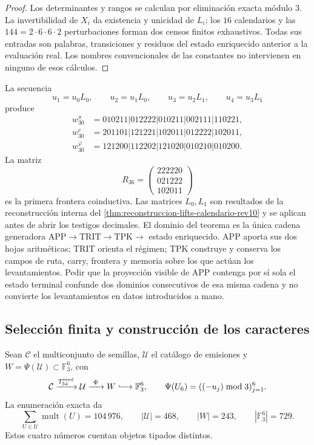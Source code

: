 \begin{proof}
Los determinantes y rangos se calculan por eliminación exacta módulo \(3\).
La invertibilidad de \(X_i\) da existencia y unicidad de \(L_i\); los
\(16\) calendarios y las \(144=2\cdot6\cdot6\cdot2\) perturbaciones forman
dos censos finitos exhaustivos. Todas sus entradas son palabras, transiciones
y residuos del estado enriquecido anterior a la evaluación real. Los nombres
convencionales de las constantes no intervienen en ninguno de esos cálculos.
\end{proof}

La secuencia
\[
u_1=u_0L_0,\qquad u_2=u_1L_0,\qquad
u_3=u_2L_1,\qquad u_4=u_3L_1
\]
produce
\[
\begin{aligned}
w_{30}^{\pi}&=010211|012222|010211|002111|110221,\\
w_{30}^{e}&=201101|121221|102011|012222|102011,\\
w_{30}^{\varphi}&=121200|112202|121020|010210|010200.
\end{aligned}
\]
La matriz
\[
R_{36}=
\begin{pmatrix}
222220\\021222\\102011
\end{pmatrix}
\]
es la primera frontera coinductiva. Las matrices \(L_0,L_1\) son resultados
de la reconstrucción interna del
\cref{thm:reconstruccion-lifts-calendario-rev10} y se aplican antes de abrir
los testigos decimales. El dominio del teorema es la única cadena generadora
\(\mathrm{APP}\to\mathrm{TRIT}\to\mathrm{TPK}\to\) estado enriquecido.
APP aporta sus dos hojas aritméticas; TRIT orienta el régimen; TPK construye
y conserva los campos de ruta, carry, frontera y memoria sobre los que actúan
los levantamientos. Pedir que la proyección visible de APP contenga por sí
sola el estado terminal confunde dos dominios consecutivos de esa misma
cadena y no convierte los levantamientos en datos introducidos a mano.

\subsection{Selección finita y construcción de los caracteres}

Sean \(\mathcal C\) el multiconjunto de semillas, \(\mathcal U\) el catálogo
de emisiones y \(W=\Psi(\mathcal U)\subset\mathbb F_3^6\), con
\[
 \mathcal C\xrightarrow{T_{54}^{\rm seed}}\mathcal U
 \xrightarrow{\ \Psi\ }W\lhook\joinrel\longrightarrow\mathbb F_3^6,
 \qquad
 \Psi(U_6)=((-u_j)\bmod3)_{j=1}^6.
\]
La enumeración exacta da
\[
 \sum_{U\in\mathcal U}\operatorname{mult}(U)=104\,976,\qquad
 |\mathcal U|=468,\qquad |W|=243,\qquad|\mathbb F_3^6|=729.
\]
Estos cuatro números cuentan objetos tipados distintos.

